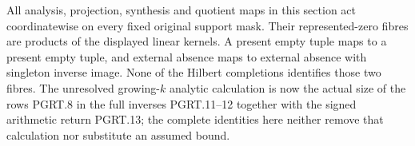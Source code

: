 All analysis, projection, synthesis and quotient maps in this section
act coordinatewise on every fixed original support mask. Their
represented-zero fibres are products of the displayed linear kernels.
A present empty tuple maps to a present empty tuple, and external
absence maps to external absence with singleton inverse image.
None of the Hilbert completions identifies those two fibres.
The unresolved growing-$k$ analytic calculation is now the actual
size of the rows PGRT.8 in the full inverses PGRT.11--12 together
with the signed arithmetic return PGRT.13; the complete identities
here neither remove that calculation nor substitute an assumed bound.

